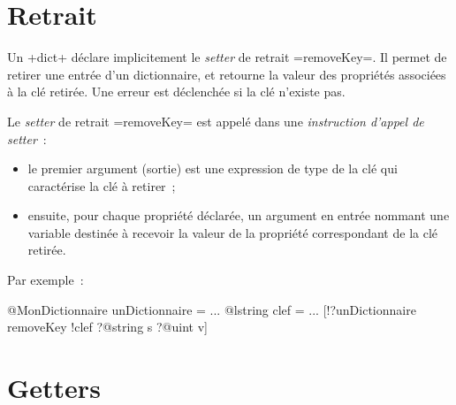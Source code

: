 \section{Retrait}

Un \ggs+dict+ déclare implicitement le \emph{setter} de retrait \ggs=removeKey=. Il permet de retirer une entrée d'un dictionnaire, et retourne la valeur des propriétés associées à la clé retirée. Une erreur est déclenchée si la clé n'existe pas.



Le \emph{setter} de retrait \ggs=removeKey= est appelé dans une \emph{instruction d'appel de setter}~:
\begin{itemize}
  \item le premier argument (sortie) est une expression de type de la clé qui caractérise la clé à retirer~;
  \item ensuite, pour chaque propriété déclarée, un argument en entrée nommant une variable destinée à recevoir la valeur de la propriété correspondant de la clé retirée.
\end{itemize}

Par exemple~:
\begin{galgas}
@MonDictionnaire unDictionnaire = {}
...
@lstring clef = ...
[!?unDictionnaire removeKey !clef ?@string s ?@uint v]
\end{galgas}

\section{Getters}

%
%

